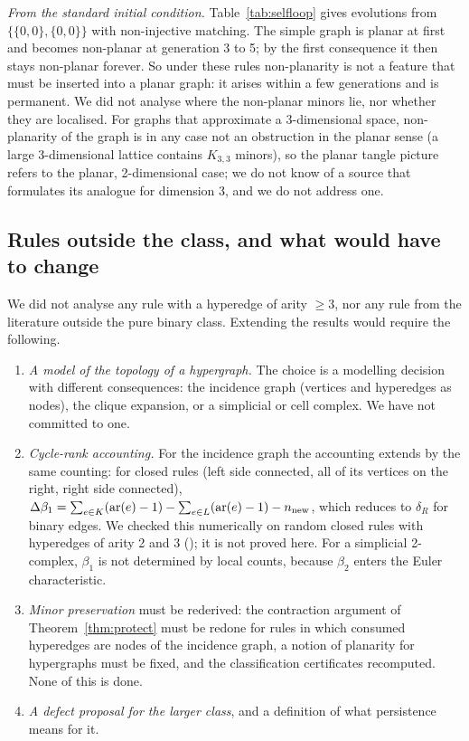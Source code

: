 \documentclass[10pt]{article}
\theoremstyle{definition}
\theoremstyle{plain}
\theoremstyle{remark}
\newcommand{\Betti}{\beta_1}
\begin{document}
\emph{From the standard initial condition.} Table~\ref{tab:selfloop} gives evolutions from $\{\{0,0\},\{0,0\}\}$ with non-injective matching. The simple graph is planar at first and becomes non-planar at generation 3 to 5; by the first consequence it then stays non-planar forever. So under these rules non-planarity is not a feature that must be inserted into a planar graph: it arises within a few generations and is permanent. We did not analyse where the non-planar minors lie, nor whether they are localised. For graphs that approximate a 3-dimensional space, non-planarity of the graph is in any case not an obstruction in the planar sense (a large 3-dimensional lattice contains $K_{3,3}$ minors), so the planar tangle picture refers to the planar, 2-dimensional case; we do not know of a source that formulates its analogue for dimension 3, and we do not address one.
\begin{table}[t]\centering\scriptsize

\caption{Evolution of the rules of Table~\ref{tab:wolfram} from the double self-loop with non-injective matching (maximal sets of disjoint matches per generation, canonical or random order; the order of the Wolfram Language is not reproduced; runs stop when $|E|>6000$).}\label{tab:selfloop}
\end{table}

\subsection{Rules outside the class, and what would have to change}
We did not analyse any rule with a hyperedge of arity $\ge3$, nor any rule from the literature outside the pure binary class. Extending the results would require the following.
\begin{enumerate}
\item \emph{A model of the topology of a hypergraph.} The choice is a modelling decision with different consequences: the incidence graph (vertices and hyperedges as nodes), the clique expansion, or a simplicial or cell complex. We have not committed to one.
\item \emph{Cycle-rank accounting.} For the incidence graph the accounting extends by the same counting: for closed rules (left side connected, all of its vertices on the right, right side connected), $\Delta\Betti=\sum_{e\in K}(\mathrm{ar}(e)-1)-\sum_{e\in L}(\mathrm{ar}(e)-1)-n_{\rm new}$, which reduces to $\delta_R$ for binary edges. We checked this numerically on random closed rules with hyperedges of arity 2 and 3 (\unskip); it is not proved here. For a simplicial 2-complex, $\Betti$ is not determined by local counts, because $\beta_2$ enters the Euler characteristic.
\item \emph{Minor preservation} must be rederived: the contraction argument of Theorem~\ref{thm:protect} must be redone for rules in which consumed hyperedges are nodes of the incidence graph, a notion of planarity for hypergraphs must be fixed, and the classification certificates recomputed. None of this is done.
\item \emph{A defect proposal for the larger class}, and a definition of what persistence means for it.
\end{enumerate}
\end{document}
